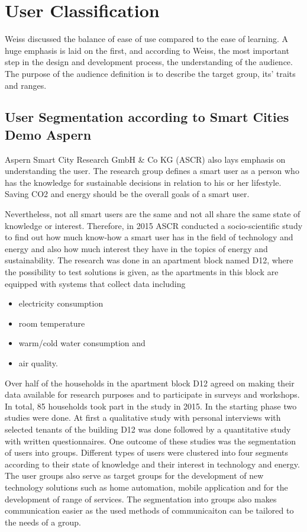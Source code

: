 \section{User Classification}


Weiss \cite{weiss2003handheld} discussed the balance of ease of use compared to the ease of learning. A huge emphasis is laid on the first, and according to Weiss, the most important step in the design and development process, the understanding of the audience. The purpose of the audience definition is to describe the target group, its' traits and ranges.

\subsection{User Segmentation according to Smart Cities Demo Aspern}

Aspern Smart City Research GmbH \& Co KG (ASCR) also lays emphasis on understanding the user. The research group defines a smart user as a person who has the knowledge for sustainable decisions in relation to his or her lifestyle. Saving CO2 and energy should be the overall goals of a smart user.

Nevertheless, not all smart users are the same and not all share the same state of knowledge or interest. Therefore, in 2015 ASCR conducted a socio-scientific study to find out how much know-how a smart user has in the field of technology and energy and also how much interest they have in the topics of energy and sustainability. The research was done in an apartment block named D12, where the possibility to test solutions is given, as the apartments in this block are equipped with systems that collect data including

\begin{itemize}
	\item electricity consumption
	\item room temperature
	\item warm/cold water consumption and
	\item air quality.
\end{itemize}

Over half of the households in the apartment block D12 agreed on making their data available for research purposes and to participate in surveys and workshops. In total, 85 households took part in the study in 2015. In the starting phase two studies were done. At first a qualitative study with personal interviews with selected tenants of the building D12 was done followed by a quantitative study with written questionnaires. One outcome of these studies was the segmentation of users into groups. Different types of users were clustered into four segments according to their state of knowledge and their interest in technology and energy. The user groups also serve as target groups for the development of new technology solutions such as home automation, mobile application and for the development of range of services. The segmentation into groups also makes communication easier as the used methods of communicaiton can be tailored to the needs of a group.

